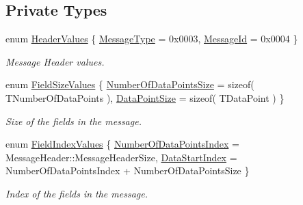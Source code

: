 \subsection*{Private Types}
\begin{DoxyCompactItemize}
\item 
enum \hyperlink{class_terra_swarm_1_1_synchronous_1_1_demand_negotiation_afbf936743aecc68e9e53598ed8146e21}{Header\-Values} \{ \hyperlink{class_terra_swarm_1_1_synchronous_1_1_demand_negotiation_afbf936743aecc68e9e53598ed8146e21a6c276b43db55c33b12b96bf8103aeccc}{Message\-Type} = 0x0003, 
\hyperlink{class_terra_swarm_1_1_synchronous_1_1_demand_negotiation_afbf936743aecc68e9e53598ed8146e21a19ff4bbd69f6d5e53a2c8ec3c7e6c582}{Message\-Id} = 0x0004
 \}
\begin{DoxyCompactList}\small\item\em Message Header values. \end{DoxyCompactList}\item 
enum \hyperlink{class_terra_swarm_1_1_synchronous_1_1_demand_negotiation_a4e1d77efc7d917053f43b4e7faf6dfa3}{Field\-Size\-Values} \{ \hyperlink{class_terra_swarm_1_1_synchronous_1_1_demand_negotiation_a4e1d77efc7d917053f43b4e7faf6dfa3a177cce271c67adfe880026f2991ddd24}{Number\-Of\-Data\-Points\-Size} = sizeof( T\-Number\-Of\-Data\-Points ), 
\hyperlink{class_terra_swarm_1_1_synchronous_1_1_demand_negotiation_a4e1d77efc7d917053f43b4e7faf6dfa3a98cb806c46ea5332ce3f6e2bc2c77b86}{Data\-Point\-Size} = sizeof( T\-Data\-Point )
 \}
\begin{DoxyCompactList}\small\item\em Size of the fields in the message. \end{DoxyCompactList}\item 
enum \hyperlink{class_terra_swarm_1_1_synchronous_1_1_demand_negotiation_a28b34eef9d480a2368260c99ecc487bf}{Field\-Index\-Values} \{ \hyperlink{class_terra_swarm_1_1_synchronous_1_1_demand_negotiation_a28b34eef9d480a2368260c99ecc487bfafbea2a0f9ecc4bd089bb5fae8be2777b}{Number\-Of\-Data\-Points\-Index} = Message\-Header\-:\-:Message\-Header\-Size, 
\hyperlink{class_terra_swarm_1_1_synchronous_1_1_demand_negotiation_a28b34eef9d480a2368260c99ecc487bfa87d6d357dd529ff7f9503d69dd044a5b}{Data\-Start\-Index} = Number\-Of\-Data\-Points\-Index + Number\-Of\-Data\-Points\-Size
 \}
\begin{DoxyCompactList}\small\item\em Index of the fields in the message. \end{DoxyCompactList}\item 

\end{DoxyCompactItemize}

